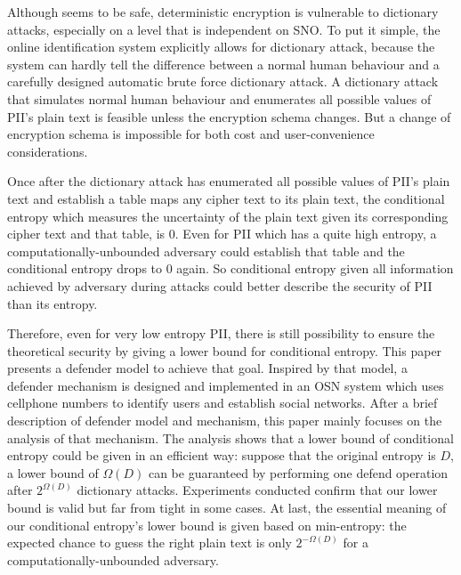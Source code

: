 \documentclass[10pt, conference, compsocconf]{IEEEtran}
\begin{document}
	
	Although seems to be safe, deterministic encryption is 
	vulnerable to dictionary attacks, especially
	on a level that is independent on SNO.
	To put it simple, the online identification system explicitly
	allows for dictionary attack, because the system can hardly tell
	the difference between a normal human behaviour and a carefully 
	designed automatic brute force dictionary attack. A dictionary
	attack that simulates normal human behaviour and enumerates all
	possible values of PII's plain text is feasible unless the encryption
	schema changes. But a change of encryption schema is impossible
	for both cost and user-convenience considerations.	
	
	Once after the dictionary attack has enumerated all possible values
	of PII's plain text and establish a table maps any cipher text
	to its plain text, the conditional entropy \cite{math_book, info_measure}
	which measures the uncertainty of the plain text given
	its corresponding cipher text and that table, is $0$.
	Even for PII which has a quite high entropy, a
	computationally-unbounded adversary could establish that table
	and the conditional entropy drops to $0$ again. 
	So conditional entropy given
	all information achieved by adversary during attacks
	could better describe the security of PII than its entropy.
	
	Therefore, even for very low entropy PII, 
	there is still possibility to ensure the
	theoretical security by giving a lower bound for conditional entropy.
	This paper presents a defender model to achieve that goal.
	Inspired by that model, a defender mechanism is designed and implemented
	in an OSN system which uses cellphone numbers
	to identify users and establish social networks.
	After a brief description of defender model and mechanism,
	this paper mainly focuses on the analysis of that mechanism.
	The analysis shows that a lower bound 
	of conditional entropy could be given in an efficient way: suppose that the original entropy
	is $D$, a lower bound of $\Omega(D)$ can be guaranteed
	by performing one defend operation after $2^{\Omega(D)}$ 
	dictionary attacks.
	Experiments conducted confirm that
	our lower bound is valid but far from tight in some cases. At last, the essential
	meaning of our conditional entropy's lower bound is given based on min-entropy: 
	the expected chance to guess the right plain text is only $2^{-\Omega(D)}$ for
	a computationally-unbounded adversary.
	
\end{document}
